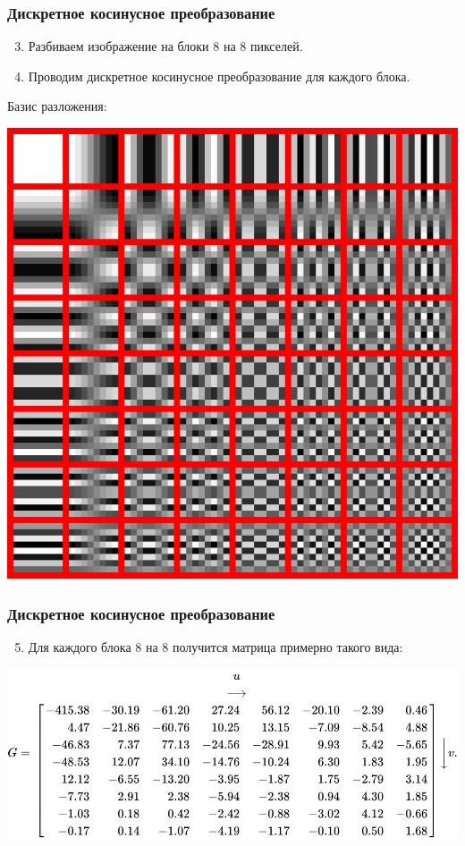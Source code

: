 \documentclass[10pt,pdf,hyperref={unicode}]{beamer}
\begin{document}
\begin{frame}[fragile]
\frametitle{Дискретное косинусное преобразование} 

\begin{enumerate}
\setcounter{enumi}{2}
\item Разбиваем изображение на блоки 8 на 8 пикселей.
\item Проводим дискретное косинусное преобразование для каждого блока.
\end{enumerate}

Базис разложения:
\begin{center}
\includegraphics[scale=0.26]{./images/dctjpeg.png}
\end{center}
\end{frame}

\begin{frame}[fragile]
\frametitle{Дискретное косинусное преобразование} 
\begin{enumerate}
\setcounter{enumi}{4}
\item Для каждого блока 8 на 8 получится матрица примерно такого вида:
\end{enumerate}
\begin{center}
\includegraphics[scale=0.45]{./images/matrix1.png}
\end{center}
\end{frame}
\end{document}

